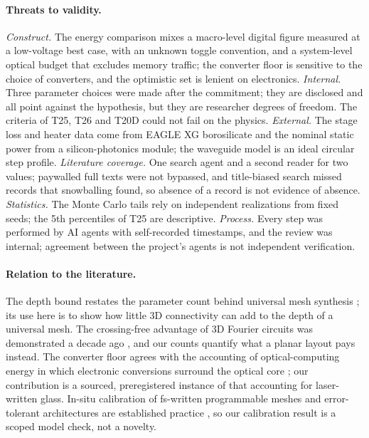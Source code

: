 \documentclass[11pt,a4paper]{article}
\begin{document}
\paragraph{Threats to validity.} \emph{Construct.} The energy comparison mixes a macro-level digital figure measured at a low-voltage best case, with an unknown toggle convention, and a system-level optical budget that excludes memory traffic; the converter floor is sensitive to the choice of converters, and the optimistic set is lenient on electronics. \emph{Internal.} Three parameter choices were made after the commitment; they are disclosed and all point against the hypothesis, but they are researcher degrees of freedom. The criteria of T25, T26 and T20D could not fail on the physics. \emph{External.} The stage loss and heater data come from EAGLE XG borosilicate and the nominal static power from a silicon-photonics module; the waveguide model is an ideal circular step profile. \emph{Literature coverage.} One search agent and a second reader for two values; paywalled full texts were not bypassed, and title-biased search missed records that snowballing found, so absence of a record is not evidence of absence. \emph{Statistics.} The Monte Carlo tails rely on independent realizations from fixed seeds; the 5th percentiles of T25 are descriptive. \emph{Process.} Every step was performed by AI agents with self-recorded timestamps, and the review was internal; agreement between the project's agents is not independent verification.

\paragraph{Relation to the literature.} The depth bound restates the parameter count behind universal mesh synthesis \cite{Reck1994,Clements2016}; its use here is to show how little 3D connectivity can add to the depth of a universal mesh. The crossing-free advantage of 3D Fourier circuits was demonstrated a decade ago \cite{Crespi2016}, and our counts quantify what a planar layout pays instead. The converter floor agrees with the accounting of optical-computing energy in which electronic conversions surround the optical core \cite{Hamerly2019,McMahon2023}; our contribution is a sourced, preregistered instance of that accounting for laser-written glass. In-situ calibration of fs-written programmable meshes and error-tolerant architectures are established practice \cite{Kondratyev2024,Pentangelo2024,Saygin2020}, so our calibration result is a scoped model check, not a novelty.
\end{document}
